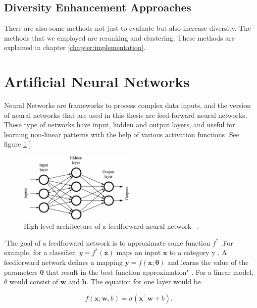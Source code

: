 \subsection{Diversity Enhancement Approaches}

There are also some methods not just to evaluate but also increase diversity. The methods that we employed are reranking and clustering. These methods are explained in chapter \ref{chapter:implementation}.

\section{Artificial Neural Networks}\label{research:nn}

Neural Networks are frameworks to process complex data inputs, and the version of neural networks that are used in this thesis are feed-forward neural networks. These type of networks have input, hidden and output layers, and useful for learning non-linear patterns with the help of various activation functions [See figure \ref{fig:ffnn} ].

\begin{figure}[htp]
	\centering
	\includegraphics[width=0.5\textwidth]{figures/FFNN.png}
	\caption{High level architecture of a feedforward neural network ~\parencite{nnimagesource}.}
	\label{fig:ffnn}
\end{figure}


'The goal of a feedforward network is to approximate some function $f^{*}$ .For example, for a classifier,  $y=f^{*}(\boldsymbol{x})$ maps an input  $\boldsymbol{x}$ to a category y .  A feedforward network  defines a mapping $\boldsymbol{y}=f(\boldsymbol{x} ; \boldsymbol{\theta})$ and learns the value of the parameters $\boldsymbol{\theta}$  that result in the best function approximation" \cite{Goodfellow-et-al-2016}. For a linear model, $\theta$ would consist of $\boldsymbol{w}$ and $\boldsymbol{b}$. The equation for one layer would be

\begin{equation}
f(\boldsymbol{x} ; \boldsymbol{w}, b)=\sigma(\boldsymbol{x}^{\top} \boldsymbol{w}+b) .
\label{eq:nn-one-layer}
\end{equation} 

